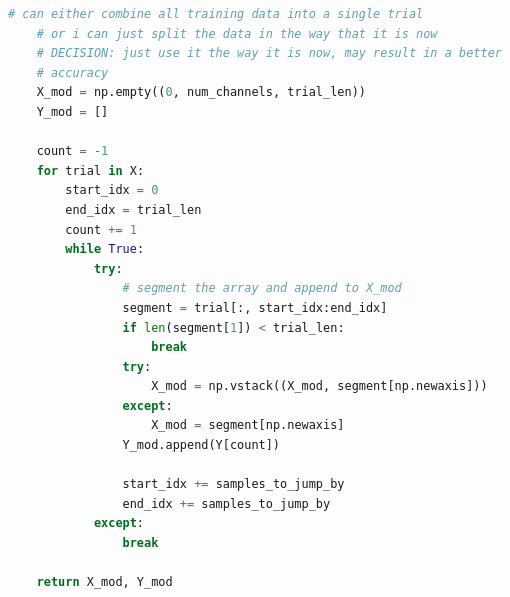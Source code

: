 \documentclass[conference]{IEEEtran}
\begin{document}
\begin{lstlisting}[language=Python, caption=Data Preprocessing Code, label=preprocessing_code]
    # can either combine all training data into a single trial
    # or i can just split the data in the way that it is now
    # DECISION: just use it the way it is now, may result in a better
    # accuracy
    X_mod = np.empty((0, num_channels, trial_len))
    Y_mod = []

    count = -1
    for trial in X:
        start_idx = 0
        end_idx = trial_len
        count += 1
        while True:
            try:
                # segment the array and append to X_mod
                segment = trial[:, start_idx:end_idx]
                if len(segment[1]) < trial_len:
                    break
                try:
                    X_mod = np.vstack((X_mod, segment[np.newaxis]))
                except:
                    X_mod = segment[np.newaxis]
                Y_mod.append(Y[count])

                start_idx += samples_to_jump_by
                end_idx += samples_to_jump_by
            except:
                break

    return X_mod, Y_mod
    \end{lstlisting}
\end{document}
